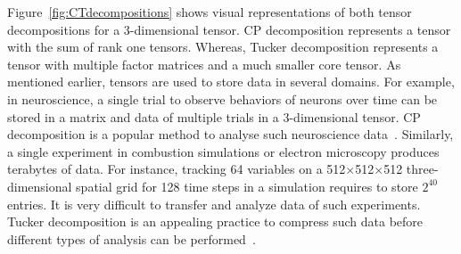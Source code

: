 \documentclass[a4paper,11pt]{article}
\newcommand{\bora}[1]{{\color{magenta} \emph{#1}}}
\begin{document}
	Figure~\ref{fig:CTdecompositions} shows visual representations of both tensor decompositions for a 3-dimensional tensor. CP decomposition represents a tensor with the sum of rank one tensors. Whereas, Tucker decomposition represents a tensor with multiple factor matrices and a much smaller core tensor. As mentioned earlier, tensors are used to store data in several domains. For example, in neuroscience, a single trial to observe behaviors of neurons over time can be stored in a matrix and data of multiple trials in a 3-dimensional tensor. CP decomposition is a popular method to analyse such neuroscience data~\cite{WKV-Neuron-2018}.
	Similarly, a single experiment in combustion simulations or electron microscopy produces terabytes of data. For instance, tracking 64 variables on a 512$\times$512$\times$512 three-dimensional spatial grid for 128 time steps in a simulation requires to store $2^{40}$ entries. It is very difficult to transfer and analyze data of such experiments. Tucker decomposition is an appealing practice to compress such data before different types of analysis can be performed~\cite{ABK-IPDPS-2016}.
	
	
	
	

	
	
\end{document}

